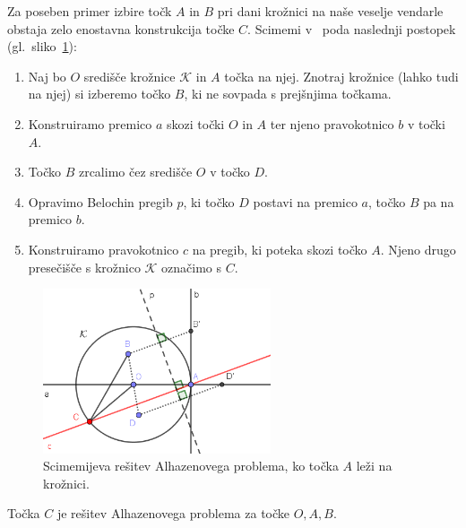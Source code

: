 Za poseben primer izbire točk $A$ in $B$ pri dani krožnici na naše veselje vendarle obstaja zelo enostavna konstrukcija točke $C$. Scimemi v~\cite[str.\ 116-117]{scimemi2002} poda naslednji postopek (gl.\ sliko~\ref{fig:scimemi}):
\begin{enumerate}
    \item Naj bo $O$ središče krožnice $\mathcal{K}$ in $A$ točka na njej. Znotraj krožnice (lahko tudi na njej) si izberemo točko $B$, ki ne sovpada s prejšnjima točkama.
    \item Konstruiramo premico $a$ skozi točki $O$ in $A$ ter njeno pravokotnico $b$ v točki $A$.
    \item Točko $B$ zrcalimo čez središče $O$ v točko $D$.
    \item Opravimo Belochin pregib $p$, ki točko $D$ postavi na premico $a$, točko $B$ pa na premico $b$.
    \item Konstruiramo pravokotnico $c$ na pregib, ki poteka skozi točko $A$. Njeno drugo presečišče s krožnico $\mathcal{K}$ označimo s $C$.
\end{enumerate}

\begin{figure}[h]
    \centering
    \includegraphics[width=0.6\textwidth]{images/alhazen/scimemi.png}
    \caption[Scimemijeva rešitev]{Scimemijeva rešitev Alhazenovega problema, ko točka $A$ leži na krožnici.}
    \label{fig:scimemi}
\end{figure}

\begin{trditev}
    Točka $C$ je rešitev Alhazenovega problema za točke $O, A, B$.
\end{trditev}


